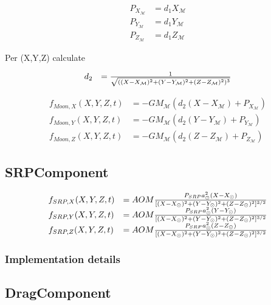 \documentclass{article}
\begin{document}
\begin{equation}
\begin{array}{ll}
P_{X_{\mathcal M}} &= d_1X_{\mathcal M} \\
P_{Y_{\mathcal M}} &= d_1Y_{\mathcal M} \\
P_{Z_{\mathcal M}} &= d_1Z_{\mathcal M}
\end{array}
\end{equation}

Per (X,Y,Z) calculate

\begin{equation}
\begin{array}{ll}
d_2 &= {1 \over \sqrt{((X-X_\mathcal M)^2+(Y-Y_\mathcal M)^2+(Z-Z_\mathcal M)^2)^3}}
\end{array}
\end{equation}

\begin{equation}
\begin{array}{ll}
f_{Moon,X}(X,Y,Z,t) &=-GM_\mathcal M(d_2(X-X_{\mathcal M})+P_{X_{\mathcal M}}) \\
f_{Moon,Y}(X,Y,Z,t) &=-GM_\mathcal M(d_2(Y-Y_{\mathcal M})+P_{Y_{\mathcal M}}) \\
f_{Moon,Z}(X,Y,Z,t) &=-GM_\mathcal M(d_2(Z-Z_{\mathcal M})+P_{Z_{\mathcal M}})
\end{array}
\end{equation}

\subsection{SRPComponent}

\begin{equation}
\begin{array}{ll}
f_{SRP,X}(X,Y,Z,t) &= AOM
{P_{SRP}a_\odot^2(X-X_\odot)\over [(X-X_\odot)^2+(Y-Y_\odot)^2+(Z-Z_\odot)^2]^{3/2}}\\
f_{SRP,Y}(X,Y,Z,t) &= AOM
{P_{SRP}a_\odot^2(Y-Y_\odot)\over [(X-X_\odot)^2+(Y-Y_\odot)^2+(Z-Z_\odot)^2]^{3/2}}\\
f_{SRP,Z}(X,Y,Z,t) &= AOM
{P_{SRP}a_\odot^2(Z-Z_\odot)\over [(X-X_\odot)^2+(Y-Y_\odot)^2+(Z-Z_\odot)^2]^{3/2}}
\end{array}
\end{equation}

\subsubsection{Implementation details}
\subsection{DragComponent}
\end{document}
